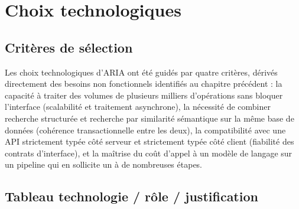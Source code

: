\section{Choix technologiques}
\label{sec:choix-techno}

\subsection{Critères de sélection}

Les choix technologiques d'ARIA ont été guidés par quatre critères, dérivés directement des besoins non fonctionnels identifiés au chapitre précédent : la capacité à traiter des volumes de plusieurs milliers d'opérations sans bloquer l'interface (scalabilité et traitement asynchrone), la nécessité de combiner recherche structurée et recherche par similarité sémantique sur la même base de données (cohérence transactionnelle entre les deux), la compatibilité avec une API strictement typée côté serveur et strictement typée côté client (fiabilité des contrats d'interface), et la maîtrise du coût d'appel à un modèle de langage sur un pipeline qui en sollicite un à de nombreuses étapes.

\subsection{Tableau technologie / rôle / justification}

